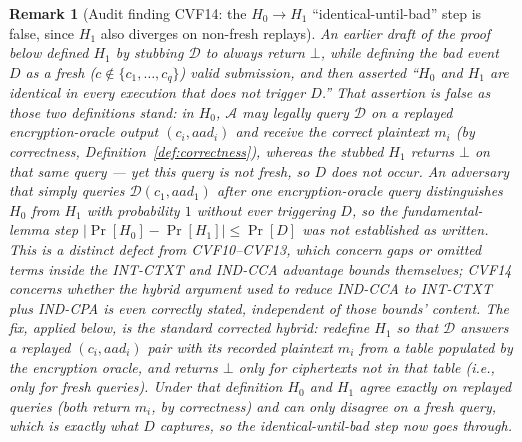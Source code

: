 \documentclass[11pt,a4paper]{article}
\newtheorem{remark}[theorem]{Remark}
\begin{document}
\begin{remark}[Audit finding CVF14: the $H_0\to H_1$ ``identical-until-bad'' step is false, since $H_1$ also diverges on non-fresh replays]
\label{rem:cvf14}
An earlier draft of the proof below defined $H_1$ by stubbing
$\mathcal{D}$ to \emph{always} return $\bot$, while defining the bad event
$D$ as a \emph{fresh} ($c \notin \{c_1,\ldots,c_q\}$) valid submission, and
then asserted ``$H_0$ and $H_1$ are identical in every execution that does
not trigger $D$.'' That assertion is false as those two definitions stand:
in $H_0$, $\mathcal{A}$ may legally query $\mathcal{D}$ on a
\emph{replayed} encryption-oracle output $(c_i, aad_i)$ and receive the
correct plaintext $m_i$ (by correctness, Definition~\ref{def:correctness}),
whereas the stubbed $H_1$ returns $\bot$ on that same query --- yet this
query is not fresh, so $D$ does not occur. An adversary that simply
queries $\mathcal{D}(c_1, aad_1)$ after one encryption-oracle query
distinguishes $H_0$ from $H_1$ with probability $1$ without ever
triggering $D$, so the fundamental-lemma step
$|\Pr[H_0]-\Pr[H_1]|\leq\Pr[D]$ was not established as written. This is a
distinct defect from CVF10--CVF13, which concern gaps or omitted terms
inside the INT-CTXT and IND-CCA advantage bounds themselves; CVF14
concerns whether the hybrid argument used to \emph{reduce} IND-CCA to
INT-CTXT plus IND-CPA is even correctly stated, independent of those
bounds' content. The fix, applied below, is the standard corrected hybrid:
redefine $H_1$ so that $\mathcal{D}$ answers a replayed $(c_i, aad_i)$
pair with its recorded plaintext $m_i$ from a table populated by the
encryption oracle, and returns $\bot$ only for ciphertexts not in that
table (i.e., only for fresh queries). Under that definition $H_0$ and
$H_1$ agree exactly on replayed queries (both return $m_i$, by
correctness) and can only disagree on a fresh query, which is exactly
what $D$ captures, so the identical-until-bad step now goes through.
\end{remark}
\end{document}
